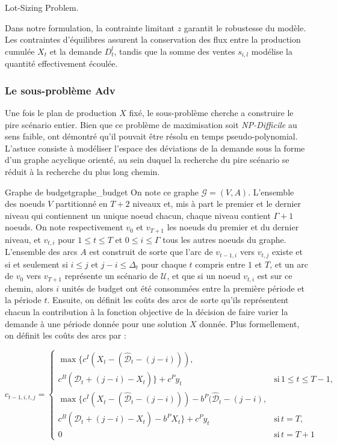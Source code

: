 \documentclass[12pt, a4paper, twoside]{report}
\numberwithin{equation}{section}
\newcommand{\adv}{\textbf{Adv} }
\begin{document}
\begin{Figure}[H]
	\vspace{-0.5em}
	{\centering
		\small Lot-Sizing Problem. \cite{portoleauTHESIS}\par
		\label{formulation_probleme_maitre}
	}
	
	Dans notre formulation, la contrainte limitant $z$ garantit le robustesse du modèle. Les contraintes d'équilibres assurent la conservation des flux entre la production cumulée $X_t$ et la demande $D_t^l$, tandis que la somme des ventes $s_{i, l}$ modélise la quantité effectivement écoulée.
	
	\subsubsection{Le sous-problème \adv}
	
	Une fois le plan de production $X$ fixé, le sous-problème cherche a construire le pire scénario entier. Bien que ce problème de maximisation soit \textit{NP-Difficile} au sens faible, \cite{guillaume2020robustproductionplanningbudgeted} ont démontré qu'il pouvait être résolu en temps pseudo-polynomial. L'astuce consiste à modéliser l'espace des déviations de la demande sous la forme d'un graphe acyclique orienté, au sein duquel la recherche du pire scénario se réduit à la recherche du plus long chemin.
	
	\begin{definition}{Graphe de budget}{graphe_budget}
		On note ce graphe $\mathcal{G}=(V, A)$. L'ensemble des noeuds $V$ partitionné en $T+2$ niveaux et, mis à part le premier et le dernier niveau qui contiennent un unique noeud chacun, chaque niveau contient $\Gamma +1$ noeuds. On note respectivement $v_0$ et $v_{T+1}$ les noeuds du premier et du dernier niveau, et $v_{t, i}$ pour $1\leq t\leq T$ et $0\leq i \leq \Gamma$ tous les autres noeuds du graphe. L'ensemble des arcs $A$ est construit de sorte que l'arc de $v_{t-1, i}$ vers $v_{t, j}$ existe et si et seulement si $i\leq j$ et $j-i\leq\Delta_t$ pour chaque $t$ compris entre $1$ et $T$, et un arc de $v_0$ vers $v_{T+1}$ représente un scénario de $\mathcal{U}$, et que si un noeud $v_{t, i}$ est sur ce chemin, alors $i$ unités de budget ont été consommées entre la première période et la période $t$. Ensuite, on définit les coûts des arcs de sorte qu'ils représentent chacun la contribution à la fonction objective de la décision de faire varier la demande à une période donnée pour une solution $X$ donnée. Plus formellement, on définit les coûts des arcs par :
		
		\[
		c_{t-1, i, t, j}=\left\{
		\begin{array}{ll}
			\max\{c^I(X_t-(\hat{\mathcal{D}}_t-(j-i))),\\
			c^B(\hat{\mathcal{D}}_t+(j-i)-X_t)\} + c^Py_t & \text{si}\, 1\leq t\leq T-1,\\
			\max\{c^I(X_t-(\hat{\mathcal{D}}_t-(j-i))) - b^P(\hat{\mathcal{D}}_t - (j-i), \\
			c^B(\hat{\mathcal{D}}_t+(j-i)-X_t) - b^PX_t\} + c^Py_t & \text{si}\, t=T,\\
			0 & \text{si}\, t=T+1
		\end{array}
		\right.
		\]
		

\end{definition}
\end{Figure}
\end{document}
